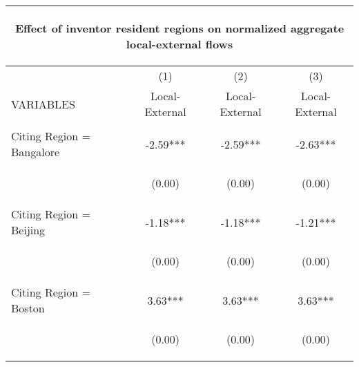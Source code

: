 \begin{center}
\begin{tabular}{lccc}
\multicolumn{4}{c}{\begin{large}Effect of inventor resident regions on normalized aggregate local-external flows \label{localexternal}\end{large}} \\ \hline
 & (1) & (2) & (3) \\
VARIABLES & Local-External & Local-External & Local-External \\ \hline
\vspace{4pt} & \begin{footnotesize}\end{footnotesize} & \begin{footnotesize}\end{footnotesize} & \begin{footnotesize}\end{footnotesize} \\
Citing Region = Bangalore & -2.59*** & -2.59*** & -2.63*** \\
\vspace{4pt} & \begin{footnotesize}(0.00)\end{footnotesize} & \begin{footnotesize}(0.00)\end{footnotesize} & \begin{footnotesize}(0.00)\end{footnotesize} \\
Citing Region = Beijing & -1.18*** & -1.18*** & -1.21*** \\
\vspace{4pt} & \begin{footnotesize}(0.00)\end{footnotesize} & \begin{footnotesize}(0.00)\end{footnotesize} & \begin{footnotesize}(0.00)\end{footnotesize} \\
Citing Region = Boston & 3.63*** & 3.63*** & 3.63*** \\
\vspace{4pt} & \begin{footnotesize}(0.00)\end{footnotesize} & \begin{footnotesize}(0.00)\end{footnotesize} & \begin{footnotesize}(0.00)\end{footnotesize} \\

\end{tabular}
\end{center}
